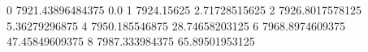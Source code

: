 0 7921.43896484375 0.0
1 7924.15625 2.71728515625
2 7926.8017578125 5.36279296875
4 7950.185546875 28.74658203125
6 7968.8974609375 47.45849609375
8 7987.333984375 65.89501953125

